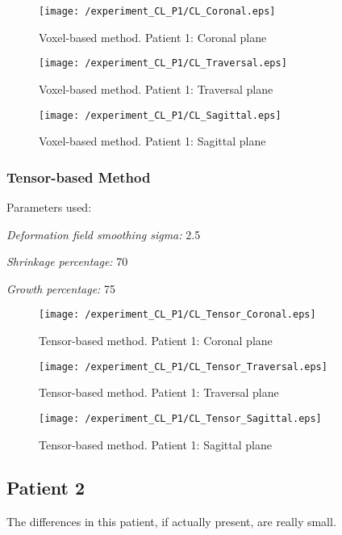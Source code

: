 \begin{figure}[H]
  \centering
  \texttt{[image: /experiment\_CL\_P1/CL\_Coronal.eps]}
  \caption{Voxel-based method. Patient 1: Coronal plane}
  \label{CL_Coronal}
\end{figure}

\begin{figure}[H]
  \centering
  \texttt{[image: /experiment\_CL\_P1/CL\_Traversal.eps]}
  \caption{Voxel-based method. Patient 1: Traversal plane}
  \label{CL_Traversal}
\end{figure}

\begin{figure}[H]
  \centering
  \texttt{[image: /experiment\_CL\_P1/CL\_Sagittal.eps]}
  \caption{Voxel-based method. Patient 1: Sagittal plane}
  \label{CL_Sagittal}
\end{figure}


\subsubsection{Tensor-based Method}
Parameters used:
\begin{description}
\item \textit{Deformation field smoothing sigma:} 2.5
\item \textit{Shrinkage percentage:} 70
\item \textit{Growth percentage:} 75
\end{description}

\begin{figure}[H]
  \centering
  \texttt{[image: /experiment\_CL\_P1/CL\_Tensor\_Coronal.eps]}
  \caption{Tensor-based method. Patient 1: Coronal plane}
  \label{CL_TCoronal}
\end{figure}

\begin{figure}[H]
  \centering
  \texttt{[image: /experiment\_CL\_P1/CL\_Tensor\_Traversal.eps]}
  \caption{Tensor-based method. Patient 1: Traversal plane}
  \label{CL_TTraversal}
\end{figure}

\begin{figure}[H]
  \centering
  \texttt{[image: /experiment\_CL\_P1/CL\_Tensor\_Sagittal.eps]}
  \caption{Tensor-based method. Patient 1: Sagittal plane}
  \label{CL_TSagittal}
\end{figure}


\subsection{Patient 2}
The differences in this patient, if actually present, are really
small. 

